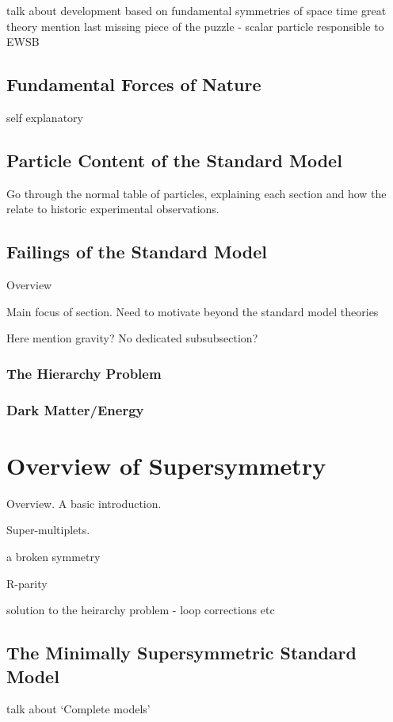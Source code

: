 talk about development
based on fundamental symmetries of space time
great theory
mention last missing piece of the puzzle - scalar particle responsible to EWSB

\subsection{Fundamental Forces of Nature}
self explanatory

\subsection{Particle Content of the Standard Model}
Go through the normal table of particles, explaining each section and how the relate 
to historic experimental observations.

\subsection{Failings of the Standard Model}
Overview

Main focus of section. Need to motivate beyond the standard model theories

Here mention gravity? No dedicated subsubsection?

\subsubsection{The Hierarchy Problem}
\subsubsection{Dark Matter/Energy}


\section{Overview of Supersymmetry}  %
\label{sec:theory_overview}
Overview. A basic introduction.

Super-multiplets.

a broken symmetry

R-parity

solution to the heirarchy problem - loop corrections etc

\subsection{The Minimally Supersymmetric Standard Model}
talk about `Complete models'

